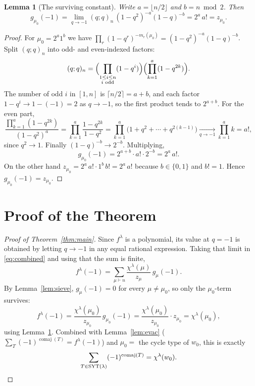 \documentclass[11pt]{article}
\newtheorem{lemma}{Lemma}
\theoremstyle{definition}
\DeclareMathOperator{\comaj}{comaj}
\DeclareMathOperator{\SYT}{SYT}
\newcommand{\wzero}{w_0}
\begin{document}
\begin{lemma}[The surviving constant]\label{lem:const}
Write $a=\lfloor n/2\rfloor$ and $b=n\bmod 2$.  Then
\[
   g_{\mu_0}(-1)=\lim_{q\to-1}(q;q)_n\,(1-q^2)^{-a}(1-q)^{-b}=2^{a}\,a!=z_{\mu_0}.
\]
\end{lemma}

\begin{proof}
For $\mu_0=2^{a}1^{b}$ we have $\prod_r(1-q^r)^{-m_r(\mu_0)}=(1-q^2)^{-a}(1-q)^{-b}$.
Split $(q;q)_n$ into odd- and even-indexed factors:
\[
   (q;q)_n=\Bigl(\prod_{\substack{1\le i\le n\\ i\text{ odd}}}(1-q^i)\Bigr)
           \Bigl(\prod_{k=1}^{a}(1-q^{2k})\Bigr).
\]
The number of odd $i$ in $[1,n]$ is $\lceil n/2\rceil=a+b$, and each factor
$1-q^i\to 1-(-1)=2$ as $q\to-1$, so the first product tends to $2^{a+b}$.  For the
even part,
\[
   \frac{\prod_{k=1}^{a}(1-q^{2k})}{(1-q^2)^{a}}
   =\prod_{k=1}^{a}\frac{1-q^{2k}}{1-q^2}
   =\prod_{k=1}^{a}\bigl(1+q^2+\cdots+q^{2(k-1)}\bigr)
   \xrightarrow[q\to-1]{}\prod_{k=1}^{a} k=a!,
\]
since $q^2\to1$.  Finally $(1-q)^{-b}\to 2^{-b}$.  Multiplying,
\[
   g_{\mu_0}(-1)=2^{a+b}\cdot a!\cdot 2^{-b}=2^{a}\,a!.
\]
On the other hand $z_{\mu_0}=2^{a}\,a!\cdot 1^{b}\,b!=2^{a}\,a!$ because $b\in\{0,1\}$
and $b!=1$.  Hence $g_{\mu_0}(-1)=z_{\mu_0}$.
\end{proof}

\section{Proof of the Theorem}

\begin{proof}[Proof of Theorem~\ref{thm:main}]
Since $f^\lambda$ is a polynomial, its value at $q=-1$ is obtained by letting
$q\to-1$ in any equal rational expression.  Taking that limit in
\eqref{eq:combined} and using that the sum is finite,
\[
   f^\lambda(-1)=\sum_{\mu\vdash n}\frac{\chi^\lambda(\mu)}{z_\mu}\,g_\mu(-1).
\]
By Lemma~\ref{lem:sieve}, $g_\mu(-1)=0$ for every $\mu\neq\mu_0$, so only the
$\mu_0$-term survives:
\[
   f^\lambda(-1)=\frac{\chi^\lambda(\mu_0)}{z_{\mu_0}}\,g_{\mu_0}(-1)
   =\frac{\chi^\lambda(\mu_0)}{z_{\mu_0}}\cdot z_{\mu_0}
   =\chi^\lambda(\mu_0),
\]
using Lemma~\ref{lem:const}.  Combined with Lemma~\ref{lem:evac}
($\sum_T(-1)^{\comaj(T)}=f^\lambda(-1)$) and $\mu_0=$ the cycle type of $\wzero$,
this is exactly
\[
   \sum_{T\in\SYT(\lambda)}(-1)^{\comaj(T)}=\chi^\lambda(\wzero).\qedhere
\]
\end{proof}
\end{document}

